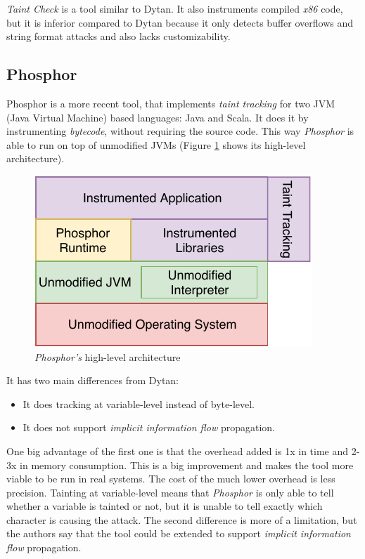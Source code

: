\textit{Taint Check} \cite{taintcheck} is a tool similar to Dytan. It also instruments compiled \textit{x86} code, but it is inferior compared to Dytan because it only detects buffer overflows and string format attacks and also lacks customizability.



\subsection{Phosphor} 
Phosphor \cite{phosphor} is a more recent tool, that implements \textit{taint tracking} for two JVM (Java Virtual Machine) based languages: Java  and Scala. It does it by instrumenting \textit{bytecode}, without requiring the source code. This way \textit{Phosphor} is able to run on top of unmodified JVMs (Figure \ref{phosphorfig} shows its high-level architecture).

\begin{figure}[h]
\centering
\includegraphics[scale=1]{images/PhosphorArchitecture.pdf}
\caption{\textit{Phosphor's} high-level architecture} \label{phosphorfig}
\end{figure}

It has two main differences from Dytan: 
\begin{itemize}
    \item It does tracking at variable-level instead of byte-level.
    \item It does not support \textit{implicit information flow} propagation.
\end{itemize}
One big advantage of the first one is that the overhead added is 1x in time and 2-3x in memory consumption. This is a big improvement and makes the tool more viable to be run in real systems. The cost of the much lower overhead is less precision. Tainting at variable-level means that \textit{Phosphor} is only able to tell whether a variable is tainted or not, but it is unable to tell exactly which character is causing the attack.
The second difference is more of a limitation, but the authors say that the tool could be extended to support \textit{implicit information flow} propagation.


